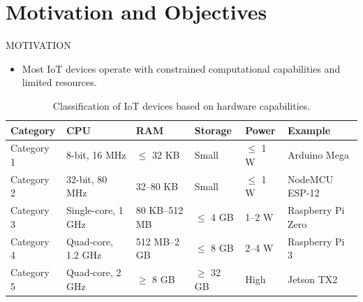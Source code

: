 \section{Motivation and Objectives}

\begin{frame}{MOTIVATION}
    \begin{itemize}
        \item Most IoT devices operate with constrained computational capabilities and limited resources.
    \end{itemize}
    \begin{table}[ht]
    \scriptsize
    \caption{Classification of IoT devices based on hardware capabilities.}
    \begin{tabular}{@{}llllll@{}}
    \toprule
    \textbf{Category} & \textbf{CPU} & \textbf{RAM} & \textbf{Storage} & \textbf{Power} & \textbf{Example} \\ 
    \midrule
    Category 1 & 8-bit, 16 MHz & $\leq$ 32 KB & Small & $\leq$ 1 W & Arduino Mega \\
    Category 2 & 32-bit, 80 MHz & 32–80 KB & Small & $\leq$ 1 W & NodeMCU ESP-12 \\
    Category 3 & Single-core, 1 GHz & 80 KB–512 MB & $\leq$ 4 GB & 1–2 W & Raspberry Pi Zero \\
    Category 4 & Quad-core, 1.2 GHz & 512 MB–2 GB & $\leq$ 8 GB & 2–4 W & Raspberry Pi 3 \\
    Category 5 & Quad-core, 2 GHz & $\geq$ 8 GB & $\geq$ 32 GB & High & Jetson TX2 \\
    \bottomrule
    \end{tabular}
    \end{table}
\end{frame}


